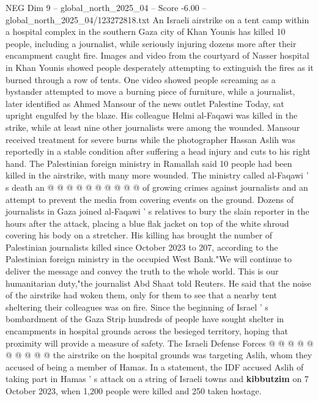 \begin{textsample}{NEG Dim 9 – global\_north\_2025\_04 – Score -6.00 – global\_north\_2025\_04/123272818.txt}  \label{ex:f9_neg_129}
An Israeli airstrike on a tent camp within a hospital complex in the southern Gaza city of Khan Younis has killed 10 people, including a journalist, while seriously injuring dozens more after their encampment caught fire.
Images and video from the courtyard of Nasser hospital in Khan Younis showed people desperately attempting to extinguish the fires as it burned through a row of tents.
One video showed people screaming as a bystander attempted to move a burning piece of furniture, while a journalist, later identified as Ahmed Mansour of the news outlet Palestine Today, sat upright engulfed by the blaze.
His colleague Helmi al-Faqawi was killed in the strike, while at least nine other journalists were among the wounded.
Mansour received treatment for severe burns while the photographer Hassan Aslih was reportedly in a stable condition after suffering a head injury and cuts to his right hand.
The Palestinian foreign ministry in Ramallah said 10 people had been killed in the airstrike, with many more wounded.
The ministry called al-Faqawi ' s death an @ @ @ @ @ @ @ @ @ @ of growing crimes against journalists and an attempt to prevent the media from covering events on the ground.
Dozens of journalists in Gaza joined al-Faqawi ' s relatives to bury the slain reporter in the hours after the attack, placing a blue flak jacket on top of the white shroud covering his body on a stretcher.
His killing has brought the number of Palestinian journalists killed since October 2023 to 207, according to the Palestinian foreign ministry in the occupied West Bank."We will continue to deliver the message and convey the truth to the whole world.
This is our humanitarian duty,"the journalist Abd Shaat told Reuters.
He said that the noise of the airstrike had woken them, only for them to see that a nearby tent sheltering their colleagues was on fire.
Since the beginning of Israel ' s bombardment of the Gaza Strip hundreds of people have sought shelter in encampments in hospital grounds across the besieged territory, hoping that proximity will provide a measure of safety.
The Israeli Defense Forces @ @ @ @ @ @ @ @ @ @ the airstrike on the hospital grounds was targeting Aslih, whom they accused of being a member of Hamas.
In a statement, the IDF accused Aslih of taking part in Hamas ' s attack on a string of Israeli towns and \textbf{kibbutzim} on 7 October 2023, when 1,200 people were killed and 250 taken hostage.

\end{textsample}
